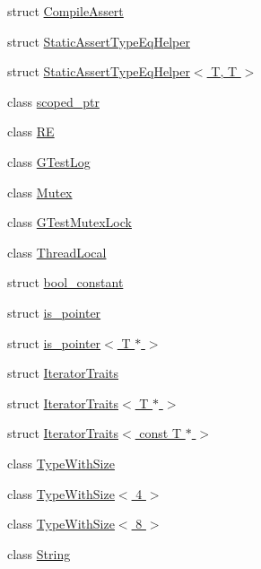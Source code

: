 \begin{DoxyCompactItemize}
\item 
struct \hyperlink{structtesting_1_1internal_1_1CompileAssert}{Compile\-Assert}
\item 
struct \hyperlink{structtesting_1_1internal_1_1StaticAssertTypeEqHelper}{Static\-Assert\-Type\-Eq\-Helper}
\item 
struct \hyperlink{structtesting_1_1internal_1_1StaticAssertTypeEqHelper_3_01T_00_01T_01_4}{Static\-Assert\-Type\-Eq\-Helper$<$ T, T $>$}
\item 
class \hyperlink{classtesting_1_1internal_1_1scoped__ptr}{scoped\-\_\-ptr}
\item 
class \hyperlink{classtesting_1_1internal_1_1RE}{R\-E}
\item 
class \hyperlink{classtesting_1_1internal_1_1GTestLog}{G\-Test\-Log}
\item 
class \hyperlink{classtesting_1_1internal_1_1Mutex}{Mutex}
\item 
class \hyperlink{classtesting_1_1internal_1_1GTestMutexLock}{G\-Test\-Mutex\-Lock}
\item 
class \hyperlink{classtesting_1_1internal_1_1ThreadLocal}{Thread\-Local}
\item 
struct \hyperlink{structtesting_1_1internal_1_1bool__constant}{bool\-\_\-constant}
\item 
struct \hyperlink{structtesting_1_1internal_1_1is__pointer}{is\-\_\-pointer}
\item 
struct \hyperlink{structtesting_1_1internal_1_1is__pointer_3_01T_01_5_01_4}{is\-\_\-pointer$<$ T $\ast$ $>$}
\item 
struct \hyperlink{structtesting_1_1internal_1_1IteratorTraits}{Iterator\-Traits}
\item 
struct \hyperlink{structtesting_1_1internal_1_1IteratorTraits_3_01T_01_5_01_4}{Iterator\-Traits$<$ T $\ast$ $>$}
\item 
struct \hyperlink{structtesting_1_1internal_1_1IteratorTraits_3_01const_01T_01_5_01_4}{Iterator\-Traits$<$ const T $\ast$ $>$}
\item 
class \hyperlink{classtesting_1_1internal_1_1TypeWithSize}{Type\-With\-Size}
\item 
class \hyperlink{classtesting_1_1internal_1_1TypeWithSize_3_014_01_4}{Type\-With\-Size$<$ 4 $>$}
\item 
class \hyperlink{classtesting_1_1internal_1_1TypeWithSize_3_018_01_4}{Type\-With\-Size$<$ 8 $>$}
\item 
class \hyperlink{classtesting_1_1internal_1_1String}{String}

\end{DoxyCompactItemize}
